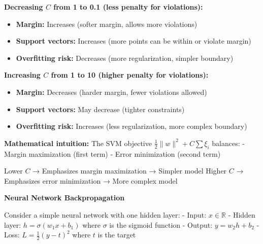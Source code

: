 \documentclass{../../common/quals-template}
\begin{document}
\begin{questions}
\begin{solution}
\textbf{Decreasing $C$ from 1 to 0.1 (less penalty for violations):}
\begin{itemize}
\item \textbf{Margin:} Increases (softer margin, allows more violations)
\item \textbf{Support vectors:} Increases (more points can be within or violate margin)
\item \textbf{Overfitting risk:} Decreases (more regularization, simpler boundary)
\end{itemize}

\textbf{Increasing $C$ from 1 to 10 (higher penalty for violations):}
\begin{itemize}
\item \textbf{Margin:} Decreases (harder margin, fewer violations allowed)
\item \textbf{Support vectors:} May decrease (tighter constraints)
\item \textbf{Overfitting risk:} Increases (less regularization, more complex boundary)
\end{itemize}

\textbf{Mathematical intuition:}
The SVM objective $\frac{1}{2}\|w\|^2 + C\sum\xi_i$ balances:
- Margin maximization (first term)
- Error minimization (second term)

Lower $C$ → Emphasizes margin maximization → Simpler model
Higher $C$ → Emphasizes error minimization → More complex model
\end{solution}

\question[4] \textbf{Neural Network Backpropagation}

Consider a simple neural network with one hidden layer:
- Input: $x \in \mathbb{R}$
- Hidden layer: $h = \sigma(w_1 x + b_1)$ where $\sigma$ is the sigmoid function
- Output: $y = w_2 h + b_2$
- Loss: $L = \frac{1}{2}(y - t)^2$ where $t$ is the target



\end{questions}
\end{document}
